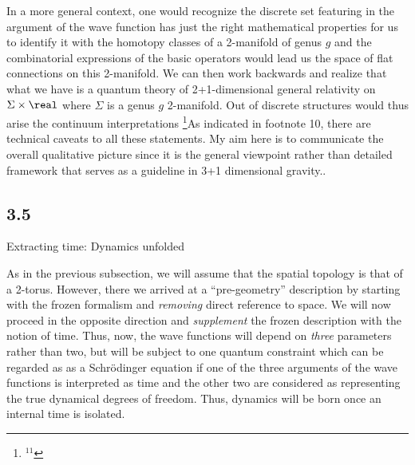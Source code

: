 In a more general context, one would recognize the discrete set featuring
in the argument of the wave function has just the right mathematical
properties for us to identify it with the homotopy classes of a 2-manifold
of genus $g$ and the combinatorial expressions of the basic operators would
lead us the space of flat connections on this 2-manifold. We can then work
backwards and realize that what we have is a quantum theory of 2+1-dimensional
general relativity on $\Sigma\times\real$ where $\Sigma$ is a genus $g$
2-manifold. Out of discrete structures would thus arise the continuum
interpretations
\footnote{$^{11}$}{As indicated in footnote 10, there are technical
caveats to all these statements. My aim here is to communicate the overall
qualitative picture since it is the general viewpoint rather than detailed
framework that serves as a guideline in 3+1 dimensional gravity.}.

\goodbreak
\subsection{3.5}{Extracting time: Dynamics unfolded}%

As in the previous subsection, we will assume that the spatial topology is
that of a 2-torus. However, there we arrived at a ``pre-geometry''
description by starting with the frozen formalism and {\it removing} direct
reference to space. We will now proceed in the opposite direction and {\it
supplement} the frozen description with the notion of time. Thus, now, the wave
functions will depend on {\it three} parameters rather than two, but will be
subject to one quantum constraint which can be regarded as as a Schr\"odinger
equation if one of the three arguments of the wave functions is interpreted
as time and the other two are considered as representing the true dynamical
degrees of freedom. Thus, dynamics will be born once an internal time is
isolated.

